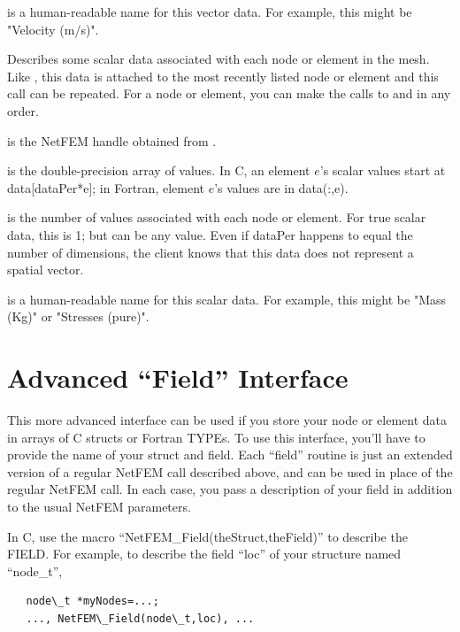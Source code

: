 \documentclass[10pt]{article}
\begin{document}
 is a human-readable name for this vector data.
For example, this might be "Velocity (m/s)".



Describes some scalar data associated with each node or element
in the mesh.  Like , this data is attached 
to the most recently listed node or element and this call 
can be repeated.  For a node or element, you can make the 
calls to  and  in any order.

 is the NetFEM handle obtained from .

 is the double-precision array of values.
In C, an element $e$'s scalar values start at data[dataPer*e];
in Fortran, element $e$'s values are in data(:,e).

 is the number of values associated with each 
node or element.  For true scalar data, this is 1; but 
can be any value.  Even if dataPer happens to equal the number
of dimensions, the client knows that this data does not 
represent a spatial vector.

 is a human-readable name for this scalar data.
For example, this might be "Mass (Kg)" or "Stresses (pure)".



\section{Advanced ``Field'' Interface}
This more advanced interface can be used if you 
store your node or element data in arrays of C structs or 
Fortran TYPEs.  To use this interface, you'll have to
provide the name of your struct and field.  Each
``field'' routine is just an extended version of 
a regular NetFEM call described above, and can be 
used in place of the regular NetFEM call.
In each case, you pass a description of your field
in addition to the usual NetFEM parameters.

In C, use the macro ``NetFEM\_Field(theStruct,theField)''
to describe the FIELD.  For example, to describe
the field ``loc'' of your structure named ``node\_t'',

\begin{verbatim}
   node\_t *myNodes=...;
   ..., NetFEM\_Field(node\_t,loc), ...
\end{verbatim}
\end{document}
